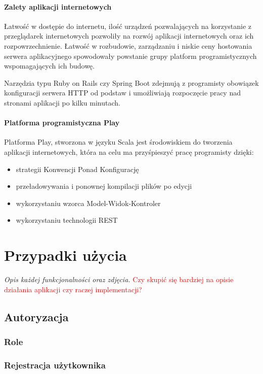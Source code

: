 \documentclass[a4paper,12pt,twoside]{article}
\begin{document}
\paragraph{Zalety aplikacji internetowych}
Łatwość w dostępie do internetu, ilość urządzeń pozwalających na 
korzystanie z przeglądarek internetowych pozwoliły 
na rozwój aplikacji internetowych oraz ich rozpowrzechnienie.
Łatwość w rozbudowie, zarządzaniu i 
niskie ceny hostowania serwera aplikacyjnego spowodowały 
powstanie grupy platform programistycznych wspomagających ich budowę. 

Narzędzia typu Ruby on Rails czy Spring Boot 
zdejmują z programisty obowiązek konfiguracji serwera 
HTTP od podstaw i umożliwiają rozpoczęcie pracy  
nad stronami aplikacji po kilku minutach.

\paragraph{Platforma programistyczna Play}
Platforma Play, stworzona w języku Scala jest środowiskiem 
do tworzenia aplikacji internetowych, 
która na celu ma przyśpieszyć pracę programisty dzięki:
\begin{itemize}
\item strategii Konwencji Ponad Konfigurację
\item przeładowywania i ponownej kompilacji plików po edycji
\item wykorzystaniu wzorca Model-Widok-Kontroler
\item wykorzystaniu technologii REST
\end{itemize} 
  
\newpage
\section{Przypadki użycia}

\textit{Opis każdej funkcjonalności oraz zdjęcia. }
\textcolor{red}{Czy skupić się bardziej na opisie działania aplikacji czy raczej implementacji?}

\subsection{Autoryzacja}
\subsubsection{Role}
\subsubsection{Rejestracja użytkownika}
\end{document}
